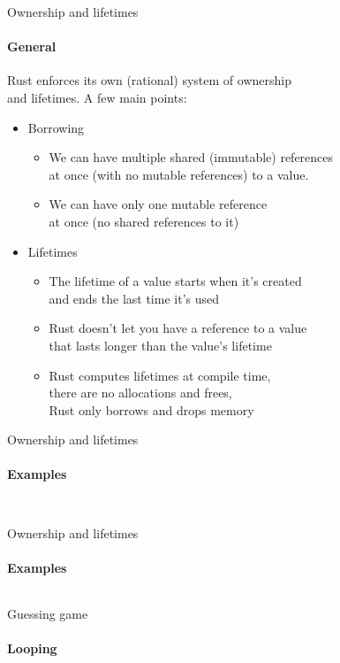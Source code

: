 \documentclass[usenames,dvipsnames,10pt,aspectratio=169]{beamer}
\begin{document}
\begin{frame}{Ownership and lifetimes}
	\framesubtitle{General}
	\normalsize
	Rust enforces its own (rational) system of ownership\\
	and lifetimes. A few main points:
	\begin{itemize}
		\item Borrowing
		\begin{itemize}
			\item We can have multiple shared (immutable) references\\
				at once (with no mutable references) to a value.
			\item We can have only one mutable reference\\
				at once (no shared references to it)
		\end{itemize}
		\item Lifetimes
		\begin{itemize}
			\item The lifetime of a value starts when it’s created\\
				and ends the last time it’s used
			\item Rust doesn’t let you have a reference to a value\\
				that lasts longer than the value’s lifetime
			\item Rust computes lifetimes at compile time,\\
				there are no allocations and frees,\\
				Rust only borrows and drops memory
		\end{itemize}
	\end{itemize}
\end{frame}

\begin{frame}{Ownership and lifetimes}
	\framesubtitle{Examples}
	\inputminted[fontsize=\normalsize]{c}{code/own1.rs}
	\vspace{0.6cm}
	\inputminted[fontsize=\normalsize]{c}{code/own2.rs}
\end{frame}

\begin{frame}{Ownership and lifetimes}
	\framesubtitle{Examples}
	\inputminted[fontsize=\large]{c}{code/own3.rs}
\end{frame}

\begin{frame}{Guessing game}
	\framesubtitle{Looping}
	\inputminted[fontsize=\normalsize]{c}{code/guess5.rs}
\end{frame}
\end{document}
